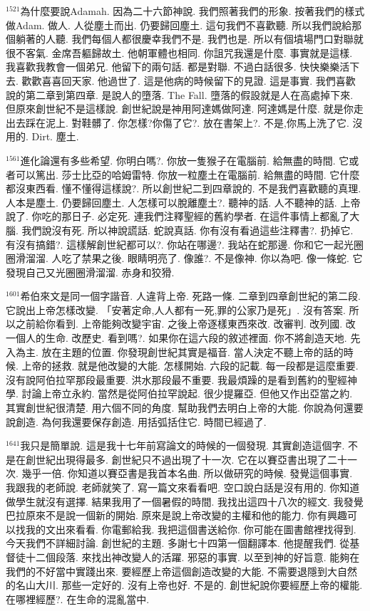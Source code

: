 \documentclass{book}
\begin{document}
$^{1521}$為什麼要說Adamah.
因為二十六節神說.
我們照著我們的形象.
按著我們的樣式做Adam.
做人.
人從塵土而出.
仍要歸回塵土.
這句我們不喜歡聽.
所以我們說給那個躺著的人聽.
我們每個人都很慶幸我們不是.
我們也是.
所以有個墳場門口對聯就很不客氣.
金席吾軀歸故土.
他朝軍體也相同.
你詛咒我還是什麼.
事實就是這樣.
我喜歡我教會一個弟兄.
他留下的兩句話.
都是對聯.
不過白話很多.
快快樂樂活下去.
歡歡喜喜回天家.
他過世了.
這是他病的時候留下的見證.
這是事實.
我們喜歡說的第二章到第四章.
是說人的墮落.
The Fall.
墮落的假設就是人在高處掉下來.
但原來創世紀不是這樣說.
創世紀說是神用阿達媽做阿達.
阿達媽是什麼.
就是你走出去踩在泥上.
對鞋髒了.
你怎樣?你傷了它?.
放在書架上?.
不是,你馬上洗了它.
沒用的.
Dirt.
塵土.

$^{1561}$進化論還有多些希望.
你明白嗎?.
你放一隻猴子在電腦前.
給無盡的時間.
它或者可以篤出.
莎士比亞的哈姆雷特.
你放一粒塵土在電腦前.
給無盡的時間.
它什麼都沒東西看.
懂不懂得這樣說?.
所以創世紀二到四章說的.
不是我們喜歡聽的真理.
人本是塵土.
仍要歸回塵土.
人怎樣可以脫離塵土?.
聽神的話.
人不聽神的話.
上帝說了.
你吃的那日子.
必定死.
連我們注釋聖經的舊約學者.
在這件事情上都亂了大腦.
我們說沒有死.
所以神說謊話.
蛇說真話.
你有沒有看過這些注釋書?.
扔掉它.
有沒有搞錯?.
這樣解創世紀都可以?.
你站在哪邊?.
我站在蛇那邊.
你和它一起光圈圈滑溜溜.
人吃了禁果之後.
眼睛明亮了.
像誰?.
不是像神.
你以為吧.
像一條蛇.
它發現自己又光圈圈滑溜溜.
赤身和狡猾.

$^{1601}$希伯來文是同一個字諧音.
人違背上帝.
死路一條.
二章到四章創世紀的第二段.
它說出上帝怎樣改變.
「安著定命,人人都有一死,罪的公家乃是死」.
沒有答案.
所以之前給你看到.
上帝能夠改變宇宙.
之後上帝逐樣東西來改.
改審判.
改列國.
改一個人的生命.
改歷史.
看到嗎?.
如果你在這六段的敘述裡面.
你不將創造天地.
先入為主.
放在主題的位置.
你發現創世紀其實是福音.
當人決定不聽上帝的話的時候.
上帝的拯救.
就是他改變的大能.
怎樣開始.
六段的記載.
每一段都是這麼重要.
沒有說阿伯拉罕那段最重要.
洪水那段最不重要.
我最煩躁的是看到舊約的聖經神學.
討論上帝立永約.
當然是從阿伯拉罕說起.
很少提羅亞.
但他又作出亞當之約.
其實創世紀很清楚.
用六個不同的角度.
幫助我們去明白上帝的大能.
你說為何還要說創造.
為何我還要保存創造.
用括弧括住它.
時間已經過了.

$^{1641}$我只是簡單說.
這是我十七年前寫論文的時候的一個發現.
其實創造這個字.
不是在創世紀出現得最多.
創世紀只不過出現了十一次.
它在以賽亞書出現了二十一次.
幾乎一倍.
你知道以賽亞書是我首本名曲.
所以做研究的時候.
發覺這個事實.
我跟我的老師說.
老師就笑了.
寫一篇文來看看吧.
空口說白話是沒有用的.
你知道做學生就沒有選擇.
結果我用了一個暑假的時間.
我找出這四十八次的經文.
我發覺巴拉原來不是說一個新的開始.
原來是說上帝改變的主權和他的能力.
你有興趣可以找我的文出來看看.
你電郵給我.
我把這個書送給你.
你可能在圖書館裡找得到.
今天我們不詳細討論.
創世紀的主題.
多謝七十四第一個翻譯本.
他提醒我們.
從基督徒十二個段落.
來找出神改變人的活躍.
邪惡的事實.
以至到神的好旨意.
能夠在我們的不好當中實踐出來.
要經歷上帝這個創造改變的大能.
不需要退隱到大自然的名山大川.
那些一定好的.
沒有上帝也好.
不是的.
創世紀說你要經歷上帝的權能.
在哪裡經歷?.
在生命的混亂當中.
\end{document}
